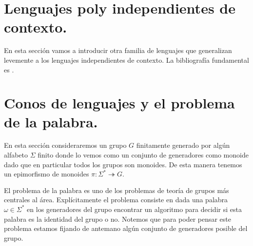 \documentclass[tesis.tex]{subfiles}
\newcommand{\APD}{automáta de pila determinístico }
\begin{document}
\begin{ej}
	\begin{comment}[Esto es con la otra definición de automáta de pila.]
			Por el principio del palomar podemos ver que este lenguaje no es aceptado por \APD por pila vacía y estado final a la vez. Si así lo fuera supongamos que existe un automáta que lo acepta $M = (Q, \Sigma, Z, Z_0, \delta, q_0 , F)$. Debido a que tiene finitos estados podemos elegirnos $m$ suficientemente grande tal que existan palabras $a^mb^j, a^mb^i$ con $1 \le i < j < m$ y elegidas de manera que terminen en el mismo estado final $p$. Notemos que $(q_0,a^mb^ib^{m-j+1},Z_0) \vdash^* (q,\lambda, Z)$ donde $q$ es un estado final dado que $m-j+1+i \le m$. Por otro lado debe ser que $(q_0, a^mb^jb^{m-j+1}) \vdash^* (q,\lambda, Z) $ pero notemos que $a^mb^{m-1} \notin L$. Por lo tanto llegamos a una contradicción y de esta manera vemos que $L$ no es aceptado por un \APD especial tal como queríamos ver.
	\end{comment}

	
\end{ej}





\section{Lenguajes poly independientes de contexto.}

En esta sección vamos a introducir otra familia de lenguajes que generalizan levemente a los lenguajes independientes de contexto. 
La bibliografía fundamental es \cite{brough_groups_2014}.


\section{Conos de lenguajes y el problema de la palabra.}

En esta sección consideraremos un grupo $G$ finitamente generado por algún alfabeto $\Sigma$ finito donde lo vemos como un conjunto de generadores como monoide dado que en particular todos los grupos son monoides. 
De esta manera tenemos un epimorfismo de monoides $\pi: \Sigma^* \twoheadrightarrow  G$. 

El problema de la palabra es uno de los problemas de teoría de grupos más centrales al área. Explícitamente el problema consiste en dada una palabra $\omega \in \Sigma^*$ en los generadores del grupo encontrar un algoritmo para decidir si esta palabra es la identidad del grupo o no. Notemos que para poder pensar este problema estamos fijando de antemano algún conjunto de generadores posible del grupo.
\end{document}
